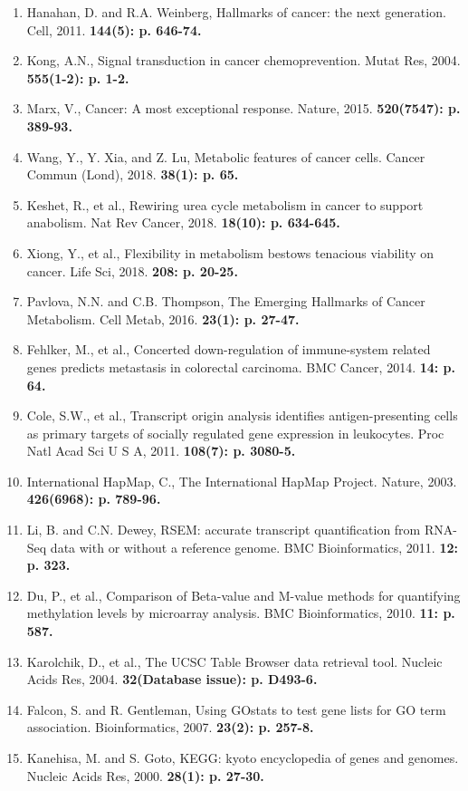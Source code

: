 \documentclass[11pt]{article}
\begin{document}
\begin{enumerate}
\item Hanahan, D. and R.A. Weinberg, Hallmarks of cancer: the next generation. Cell, 2011. \bf{144}(5): p. 646-74.

\item Kong, A.N., Signal transduction in cancer chemoprevention. Mutat Res, 2004. \bf{555}(1-2): p. 1-2.

\item Marx, V., Cancer: A most exceptional response. Nature, 2015. \bf{520}(7547): p. 389-93.

\item Wang, Y., Y. Xia, and Z. Lu, Metabolic features of cancer cells. Cancer Commun (Lond), 2018. \bf{38}(1): p. 65.

\item Keshet, R., et al., Rewiring urea cycle metabolism in cancer to support anabolism. Nat Rev Cancer, 2018. \bf{18}(10): p. 634-645.

\item Xiong, Y., et al., Flexibility in metabolism bestows tenacious viability on cancer. Life Sci, 2018. \bf{208}: p. 20-25.

\item Pavlova, N.N. and C.B. Thompson, The Emerging Hallmarks of Cancer Metabolism. Cell Metab, 2016. \bf{23}(1): p. 27-47.

\item Fehlker, M., et al., Concerted down-regulation of immune-system related genes predicts metastasis in colorectal carcinoma. BMC Cancer, 2014. \bf{14}: p. 64.

\item Cole, S.W., et al., Transcript origin analysis identifies antigen-presenting cells as primary targets of socially regulated gene expression in leukocytes. Proc Natl Acad Sci U S A, 2011. \bf{108}(7): p. 3080-5.

\item International HapMap, C., The International HapMap Project. Nature, 2003. \bf{426}(6968): p. 789-96.

\item Li, B. and C.N. Dewey, RSEM: accurate transcript quantification from RNA-Seq data with or without a reference genome. BMC Bioinformatics, 2011. \bf{12}: p. 323.

\item Du, P., et al., Comparison of Beta-value and M-value methods for quantifying methylation levels by microarray analysis. BMC Bioinformatics, 2010. \bf{11}: p. 587.

\item Karolchik, D., et al., The UCSC Table Browser data retrieval tool. Nucleic Acids Res, 2004. \bf{32}(Database issue): p. D493-6.

\item Falcon, S. and R. Gentleman, Using GOstats to test gene lists for GO term association. Bioinformatics, 2007. \bf{23}(2): p. 257-8.

\item Kanehisa, M. and S. Goto, KEGG: kyoto encyclopedia of genes and genomes. Nucleic Acids Res, 2000. \bf{28}(1): p. 27-30.
\end{enumerate}
\end{document}

